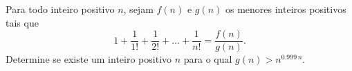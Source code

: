 Para todo inteiro positivo \(n\), sejam \(f(n)\) e \(g(n)\) os menores inteiros positivos tais que
\[
1 + \frac{1}{1!} + \frac{1}{2!} + \ldots + \frac{1}{n!} = \frac{f(n)}{g(n)}.
\]
Determine se existe um inteiro positivo \(n\) para o qual \(g(n) > n^{0.999\, n}\).
